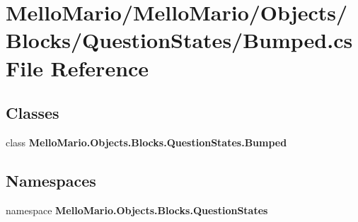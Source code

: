 \section{Mello\+Mario/\+Mello\+Mario/\+Objects/\+Blocks/\+Question\+States/\+Bumped.cs File Reference}
\label{QuestionStates_2Bumped_8cs}
\subsection*{Classes}
\begin{DoxyCompactItemize}
\item 
class \textbf{ Mello\+Mario.\+Objects.\+Blocks.\+Question\+States.\+Bumped}
\end{DoxyCompactItemize}
\subsection*{Namespaces}
\begin{DoxyCompactItemize}
\item 
namespace \textbf{ Mello\+Mario.\+Objects.\+Blocks.\+Question\+States}
\end{DoxyCompactItemize}
